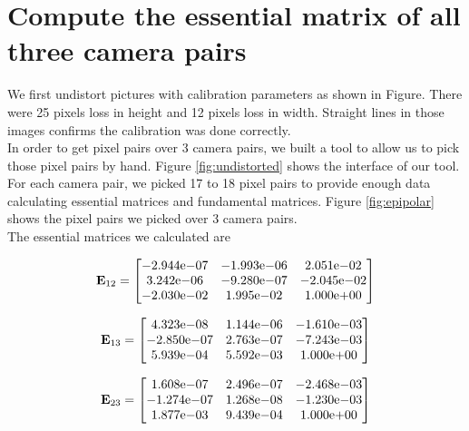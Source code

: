 \documentclass[10pt,twocolumn,letterpaper]{article}
\begin{document}
\section{Compute the essential matrix of all three camera pairs}

We first undistort pictures with calibration parameters as shown in Figure. There were 25 pixels loss in height and 12 pixels loss in width. Straight lines in those images confirms the calibration was done correctly.\\

In order to get pixel pairs over 3 camera pairs, we built a tool to allow us to pick those pixel pairs by hand. Figure \ref{fig:undistorted} shows the interface of our tool.\\

For each camera pair, we picked 17 to 18 pixel pairs to provide enough data calculating essential matrices and fundamental matrices. Figure \ref{fig:epipolar} shows the pixel pairs we picked over 3 camera pairs.\\

The essential matrices we calculated are

$$\textbf{E}_{12} =
\begin{bmatrix}
-2.944{\text e-}07&-1.993{\text e-}06&2.051{\text e-}02\\
3.242{\text e-}06&-9.280{\text e-}07&-2.045{\text e-}02\\
-2.030{\text e-}02&1.995{\text e-}02&1.000{\text e+}00 
\end{bmatrix}
$$

$$\textbf{E}_{13} =
\begin{bmatrix}
4.323{\text e-}08&1.144{\text e-}06&-1.610{\text e-}03\\
-2.850{\text e-}07&2.763{\text e-}07&-7.243{\text e-}03\\
5.939{\text e-}04&5.592{\text e-}03&1.000{\text e+}00
\end{bmatrix}
$$

$$\textbf{E}_{23} =
\begin{bmatrix}
1.608{\text e-}07&2.496{\text e-}07&-2.468{\text e-}03\\
-1.274{\text e-}07&1.268{\text e-}08&-1.230{\text e-}03\\
1.877{\text e-}03&9.439{\text e-}04&1.000{\text e+}00
\end{bmatrix}
$$
\end{document}
